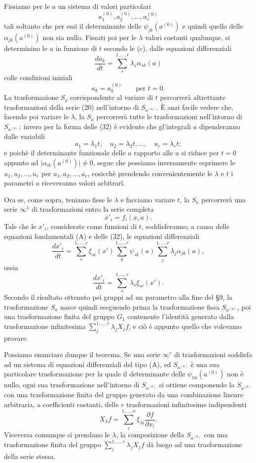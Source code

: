 \documentclass[11pt]{book}
\begin{document}
Fissiamo per le $a$ un sistema di valori particolari
\[
 a_1^{(0)},a_2^{(0)},\ldots,a_r^{(0)}
\]
tali soltanto che per essi il determinante delle $\psi_{jk}(a^{(0)})$ e quindi quello delle $\alpha_{jk}(a^{(0)})$ non sia nullo. Fissati poi per le $\lambda$ valori costanti qualunque, si determinino le $a$ in funzione di $t$ secondo le (c), dalle equazioni differenziali
\begin{equation*}\tag{32}
 \frac{da_k}{dt}=\sum\limits_s^{1,\ldots,r}\lambda_s\alpha_{sk}(a)
\end{equation*}
colle condizioni iniziali
\[
 a_k=a_k^{(0)}\qquad\text{per }t=0.
\]
La trasformazione $S_a$ corrispondente al variare di $t$ percorrerà altrettante trasformazioni della serie (20) nell'intorno di $S_{a^{(0)}}$. È anzi facile vedere che, facendo poi variare le $\lambda$, la $S_a$ percorrerà tutte le trasformazioni nell'intorno di $S_{a^{(0)}}$; invero per la forma delle (32) è evidente che gl'integrali $a$ dipenderanno dalle variabili
\[
 u_1=\lambda_1t,
 \quad u_2=\lambda_2t,
 \ldots,
 \quad u_r=\lambda_rt;
\]
e poichè il determinante funzionale delle $a$ rapporto alle $u$ si riduce per $t=0$ appunto ad $\lvert\alpha_{ik}(a^{(0)})\rvert\ne0$, segue che possiamo inversamente esprimere le $u_1,u_2,\ldots,u_r$ per $a_1,a_2,\ldots,a_r$, cosicchè prendendo convenientemente le $\lambda$ e $t$ i parametri $a$ riceveranno valori arbitrarî.

Ora se, come sopra, teniamo fisse le $\lambda$ e facciamo variare $t$, la $S_a$ percorrerà una serie $\infty^1$ di trasformazioni entro la serie completa
\[
 x'_i=f_i(x,a).
\]
Tale che le $x'_i$, considerate come funzioni di $t$, soddisferanno, a causa delle equazioni fondamentali (A) e delle (32), le equazioni differenziali
\[
 \frac{dx'_i}{dt}=\sum\limits_s^{1,\ldots,r}\xi_{si}(x')\sum\limits_k^{1,\ldots,r}\psi_{sk}(a)\sum\limits_j^{1,\ldots,r}\lambda_j\alpha_{jk}(a),
\]
ossia
\[
 \frac{dx'_i}{dt}=\sum\limits_s^{1,\ldots,r}\lambda_s\xi_{si}(x').
\]
Secondo il risultato ottenuto pei gruppi ad un parametro alla fine del \S{}9, la trasformazione $S_a$ nasce quindi eseguendo prima la trasformazione fissa $S_{a^{(0)}}$, poi una trasformazione finita del gruppo $G_1$ contenente l'identità generato dalla trasformazione infinitesima $\sum\limits_j^{1,\ldots,r}\lambda_jX_jf$, e ciò è appunto quello che volevamo provare.

Possiamo enunciare dunque il teorema.
Se una serie $\infty^r$ di trasformazioni soddisfa ad un sistema di equazioni differenziali del tipo (A), ed $S_{a^{(0)}}$ è una sua particolare trasformazione per la quale il determinante delle $\psi_{hk}(a^{(0)})$ non è nullo, ogni sua trasformazione nell'intorno di $S_{a^{(0)}}$ si ottiene componendo la $S_{a^{(0)}}$ con una trasformazione finita del gruppo generato da una combinazione lineare arbitraria, a coefficienti costanti, delle $r$ trasformazioni infinitesime indipendenti
\[
 X_\lambda f=\sum\limits_i^{1,\ldots,n}\xi_{\lambda i}\frac{\partial f}{\partial x_i}.
\]
Viceversa comunque si prendano le $\lambda$, la composizione della $S_{a^{(0)}}$ con una trasformazione finita del gruppo $\sum\limits_j^{1,\ldots,r}\lambda_jX_jf$ dà luogo ad una trasformazione della serie stessa.
\end{document}
